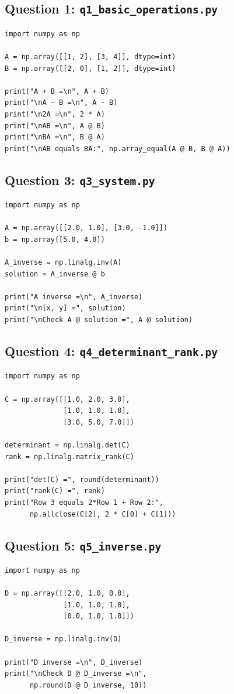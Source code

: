 \documentclass[11pt]{article}
\begin{document}
\subsection*{Question 1: \texttt{q1\_basic\_operations.py}}
\begin{lstlisting}
import numpy as np

A = np.array([[1, 2], [3, 4]], dtype=int)
B = np.array([[2, 0], [1, 2]], dtype=int)

print("A + B =\n", A + B)
print("\nA - B =\n", A - B)
print("\n2A =\n", 2 * A)
print("\nAB =\n", A @ B)
print("\nBA =\n", B @ A)
print("\nAB equals BA:", np.array_equal(A @ B, B @ A))
\end{lstlisting}

\subsection*{Question 3: \texttt{q3\_system.py}}
\begin{lstlisting}
import numpy as np

A = np.array([[2.0, 1.0], [3.0, -1.0]])
b = np.array([5.0, 4.0])

A_inverse = np.linalg.inv(A)
solution = A_inverse @ b

print("A inverse =\n", A_inverse)
print("\n[x, y] =", solution)
print("\nCheck A @ solution =", A @ solution)
\end{lstlisting}

\subsection*{Question 4: \texttt{q4\_determinant\_rank.py}}
\begin{lstlisting}
import numpy as np

C = np.array([[1.0, 2.0, 3.0],
              [1.0, 1.0, 1.0],
              [3.0, 5.0, 7.0]])

determinant = np.linalg.det(C)
rank = np.linalg.matrix_rank(C)

print("det(C) =", round(determinant))
print("rank(C) =", rank)
print("Row 3 equals 2*Row 1 + Row 2:",
      np.allclose(C[2], 2 * C[0] + C[1]))
\end{lstlisting}

\subsection*{Question 5: \texttt{q5\_inverse.py}}
\begin{lstlisting}
import numpy as np

D = np.array([[2.0, 1.0, 0.0],
              [1.0, 1.0, 1.0],
              [0.0, 1.0, 1.0]])

D_inverse = np.linalg.inv(D)

print("D inverse =\n", D_inverse)
print("\nCheck D @ D_inverse =\n",
      np.round(D @ D_inverse, 10))
\end{lstlisting}
\end{document}
